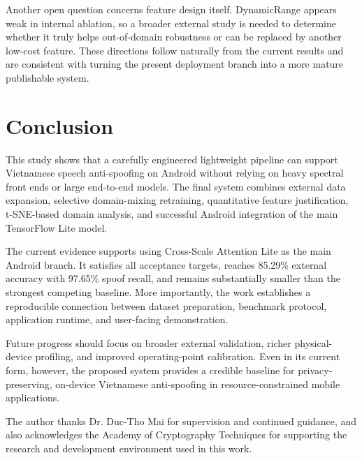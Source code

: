 \documentclass[pdflatex,sn-mathphys-num]{sn-jnl}
\begin{document}
Another open question concerns feature design itself. DynamicRange appears weak in internal ablation, so a broader external study is needed to determine whether it truly helps out-of-domain robustness or can be replaced by another low-cost feature. These directions follow naturally from the current results and are consistent with turning the present deployment branch into a more mature publishable system.

\section{Conclusion}\label{sec:conclusion}

This study shows that a carefully engineered lightweight pipeline can support Vietnamese speech anti-spoofing on Android without relying on heavy spectral front ends or large end-to-end models. The final system combines external data expansion, selective domain-mixing retraining, quantitative feature justification, t-SNE-based domain analysis, and successful Android integration of the main TensorFlow Lite model.

The current evidence supports using Cross-Scale Attention Lite as the main Android branch. It satisfies all acceptance targets, reaches 85.29\% external accuracy with 97.65\% spoof recall, and remains substantially smaller than the strongest competing baseline. More importantly, the work establishes a reproducible connection between dataset preparation, benchmark protocol, application runtime, and user-facing demonstration.

Future progress should focus on broader external validation, richer physical-device profiling, and improved operating-point calibration. Even in its current form, however, the proposed system provides a credible baseline for privacy-preserving, on-device Vietnamese anti-spoofing in resource-constrained mobile applications.

\backmatter
{}

The author thanks Dr. Duc-Tho Mai for supervision and continued guidance, and also acknowledges the Academy of Cryptography Techniques for supporting the research and development environment used in this work.


\end{document}

